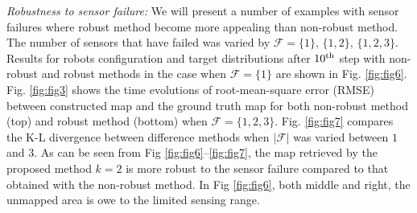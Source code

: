 \documentclass[letterpaper, 10 pt, conference]{ieeeconf}
\begin{document}
\textit{Robustness to sensor failure:} We will present a number of examples with sensor failures where robust method become more appealing than non-robust method.
The number of sensors that have failed was varied by $\mathcal{F} = \lbrace 1 \rbrace,\,\lbrace 1,2\rbrace,\,\lbrace 1,2,3 \rbrace$.
Results for robots configuration and target distributions after $10^{\textup{th}}$ step with non-robust and robust methods in the case when $\mathcal{F}= \lbrace 1\rbrace$ are shown in Fig. \ref{fig:fig6}. Fig. \ref{fig:fig3} shows the time evolutions of root-mean-square error (RMSE) between constructed map and the ground truth map for both non-robust method (top) and robust method (bottom) when $\mathcal{F}=\lbrace 1,2,3 \rbrace$. Fig. \ref{fig:fig7} compares the K-L divergence between difference methods when $\left| \mathcal{F} \right|$ was varied between $1$ and $3$.
As can be seen from Fig \ref{fig:fig6}--\ref{fig:fig7}, the map retrieved by the proposed method $k=2$ is more robust to the sensor failure compared to that obtained with the non-robust method. In Fig \ref{fig:fig6}, both middle and right, the unmapped area is owe to the limited sensing range.
\end{document}
